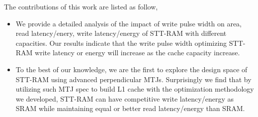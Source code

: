 The contributions of this work are listed as follow,
\begin{itemize}
\item We provide a detailed analysis of the impact of write pulse width on area, read latency/enery, write latency/energy of STT-RAM with different capacities. Our results indicate that the write pulse width optimizing STT-RAM write latency or energy will increase as the cache capacity increase.
\item To the best of our knowledge, we are the first to explore the design space of STT-RAM using advanced perpendicular MTJs. Surprisingly we find that by utilizing such MTJ spec to build L1 cache with the optimization methodology we developed, STT-RAM can have competitive write latency/energy as SRAM while maintaining equal or better read latency/energy than SRAM.
\end{itemize} 